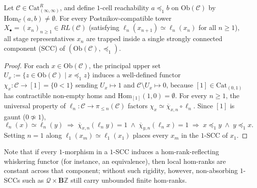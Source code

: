 \begin{theorem}\label{thm:classifier-scc-trapping}%
%
%
Let $\mathcal{C} \in \mathrm{Cat}^R_{(\infty, \infty)}$, and define $1$-cell reachability $a \preceq_1 b$ on $\mathrm{Ob}(\mathcal{C})$ by $\mathrm{Hom}_{\mathcal{C}}(a, b) \neq \emptyset$. For every Postnikov-compatible tower $X_\bullet = (x_n)_{n \ge 1} \in RL(\mathcal{C})$ (satisfying $\ell_n(x_{n+1}) \simeq \ell_n(x_n)$ for all $n \ge 1$), all stage representatives $x_n$ are trapped inside a single strongly connected component (SCC) of $(\mathrm{Ob}(\mathcal{C}), \preceq_1)$.
\end{theorem}

\begin{proof}
For each $x \in \mathrm{Ob}(\mathcal{C})$, the principal upper set $U_x := \{z \in \mathrm{Ob}(\mathcal{C}) \mid x \preceq_1 z\}$ induces a well-defined functor $\chi_x : \mathcal{C} \to [1] = \{0 < 1\}$ sending $U_x \mapsto 1$ and $\mathcal{C} \setminus U_x \mapsto 0$, because $[1] \in \mathrm{Cat}_{(0,1)}$ has contractible non-empty homs and $\mathrm{Hom}_{[1]}(1, 0) = \emptyset$. For every $n \ge 1$, the universal property of $\ell_n : \mathcal{C} \to \pi_{\le n}(\mathcal{C})$ factors $\chi_x \simeq \overline{\chi}_{x,n} \circ \ell_n$. Since $[1]$ is gaunt ($0 \not\simeq 1$),
\[
  \ell_n(x) \simeq \ell_n(y) \;\Longrightarrow\; \overline{\chi}_{x,n}(\ell_n y) = 1 \;\wedge\; \overline{\chi}_{y,n}(\ell_n x) = 1 \;\Longrightarrow\; x \preceq_1 y \;\wedge\; y \preceq_1 x.
\]
Setting $n = 1$ along $\ell_1(x_m) \simeq \ell_1(x_1)$ places every $x_m$ in the $1$-SCC of $x_1$.
\end{proof}
\noindent Note that if every $1$-morphism in a $1$-SCC induces a hom-rank-reflecting whiskering functor (for instance, an equivalence), then local hom-ranks are constant across that component; without such rigidity, however, non-absorbing $1$-SCCs such as $\mathcal{Q} \times \mathbf{B}\mathbb{Z}$ still carry unbounded finite hom-ranks.

